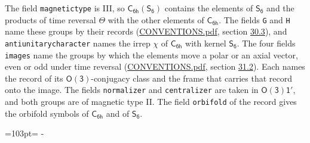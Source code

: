 \documentclass[10pt,a4paper]{article}
\newcommand{\needspace}[1]{\par\penalty-100\begingroup\dimen0=#1\relax\dimen2=\pagegoal
  \advance\dimen2-\pagetotal\ifdim\dimen0>\dimen2\relax\ifdim\dimen2>0pt\vfil\break\fi\fi
  \endgroup}
\numberwithin{equation}{section}
\newcommand{\grp}[1]{\mathsf{#1}}
\begin{document}
The field \texttt{magnetictype} is III, so $\grp{C_{6h}}(\grp{S_{6}})$ contains the elements of $\grp{S_{6}}$ and the products of time reversal $\varTheta$ with the other elements of $\grp{C_{6h}}$. The fields \texttt{G} and \texttt{H} name these groups by their records (\href{../../CONVENTIONS.pdf}{CONVENTIONS.pdf}, section \href{../../CONVENTIONS.pdf\#conv.30.3}{30.3}), and \texttt{antiunitarycharacter} names the irrep $\chi$ of $\grp{C_{6h}}$ with kernel $\grp{S_{6}}$. The four fields \texttt{images} name the groups by which the elements move a polar or an axial vector, even or odd under time reversal (\href{../../CONVENTIONS.pdf}{CONVENTIONS.pdf}, section \href{../../CONVENTIONS.pdf\#conv.31.2}{31.2}). Each names the record of its $\grp{O(3)}$-conjugacy class and the frame that carries that record onto the image. The fields \texttt{normalizer} and \texttt{centralizer} are taken in $\grp{O(3)1'}$, and both groups are of magnetic type II. The field \texttt{orbifold} of the record gives the orbifold symbols of $\grp{C_{6h}}$ and of $\grp{S_{6}}$.
\needspace{103pt}
\end{document}
